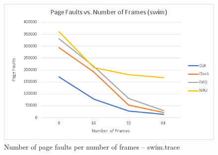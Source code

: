 \documentclass[12pt, letterpaper]{report}
\begin{document}
\begin{figure}[H]
	\centering
	\includegraphics[width=0.7\columnwidth]{pagefault_numframes_swim.png}
	\caption{Number of page faults per number of frames – swim.trace}
\end{figure}
\end{document}
